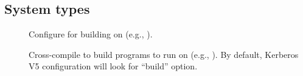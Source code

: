 \documentclass[letterpaper,10pt,english]{sphinxmanual}
\begin{document}
\subsection{System types}
\label{\detokenize{build/options2configure:system-types}}\begin{description}
\item[{\sphinxstylestrong{-}}] \leavevmode
Configure for building on 
(e.g., ).

\item[{\sphinxstylestrong{-}}] \leavevmode
Cross-compile to build programs to run on 
(e.g., ).  By default, Kerberos V5
configuration will look for “build” option.

\end{description}
\end{document}
